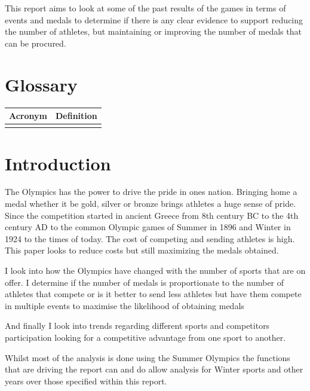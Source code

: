 \documentclass[
]{article}
\begin{document}
This report aims to look at some of the past results of the games in terms of events and medals to determine if there is any clear evidence to support reducing the number of athletes, but maintaining or improving the number of medals that can be procured.

\newpage
\tableofcontents

\section*{Glossary}\label{glossary}

\begin{longtable}[l]{>{}ll}
\toprule
Acronym & Definition\\
\midrule
\textbf{\cellcolor{gray!10}{NOC}} & \cellcolor{gray!10}{National Olympic Committee}\\
\bottomrule
\end{longtable}

\newpage

\section*{Introduction}\label{introduction}

The Olympics has the power to drive the pride in ones nation. Bringing home a medal whether it be gold, silver or bronze brings athletes a huge sense of pride. Since the competition started in ancient Greece from 8th century BC to the 4th century AD to the common Olympic games of Summer in 1896 and Winter in 1924 to the times of today. The cost of competing and sending athletes is high. This paper looks to reduce costs but still maximizing the medals obtained.

I look into how the Olympics have changed with the number of sports that are on offer. I determine if the number of medals is proportionate to the number of athletes that compete or is it better to send less athletes but have them compete in multiple events to maximise the likelihood of obtaining medals

And finally I look into trends regarding different sports and competitors participation looking for a competitive advantage from one sport to another.

Whilst most of the analysis is done using the Summer Olympics the functions that are driving the report can and do allow analysis for Winter sports and other years over those specified within this report.
\end{document}
